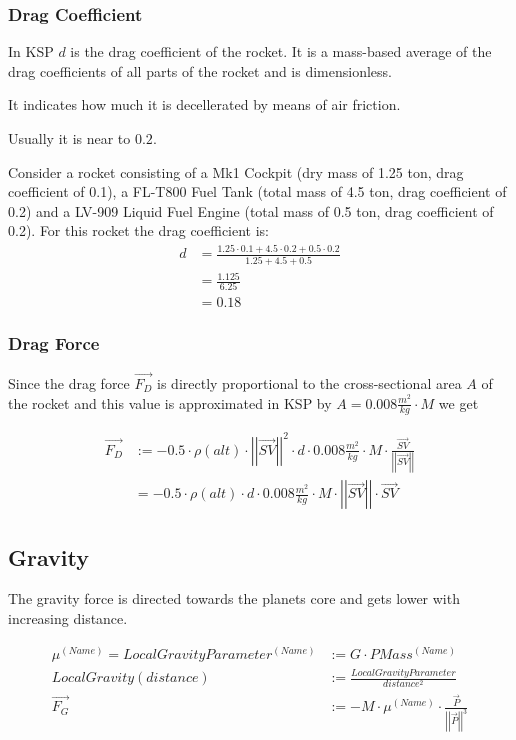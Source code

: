 \documentclass[11pt]{article}
\newcommand{\oa}[1]{\overrightarrow{#1}}
\newcommand{\F}[1]{\oa{F_{#1}}}
\newcommand{\Pos}{\oa{P}}
\newcommand{\absvec}[1]{\left|\left|{#1}\right|\right|}
\begin{document}
\subsubsection{Drag Coefficient}

In KSP $d$ is the drag coefficient of the rocket. It is a mass-based
average of the drag coefficients of all parts of the rocket and is
dimensionless.

It indicates how much it is decellerated by means of air friction.

Usually it is near to $0.2$.

Consider a rocket consisting of a Mk1 Cockpit (dry mass of 1.25 ton,
drag coefficient of 0.1), a FL-T800 Fuel Tank (total mass of 4.5 ton,
drag coefficient of 0.2) and a LV-909 Liquid Fuel Engine (total mass
of 0.5 ton, drag coefficient of 0.2). For this rocket the drag
coefficient is:
\begin{align}
  d &= \frac{1.25 \cdot 0.1 + 4.5 \cdot 0.2 + 0.5 \cdot 0.2}{ 1.25 + 4.5 + 0.5 }\nonumber\\
  &= \frac{1.125}{6.25}\nonumber\\
  &= 0.18\nonumber
\end{align}

\subsubsection{Drag Force}

Since the drag force $\F{D}$ is directly proportional to the
cross-sectional area $A$ of the rocket and this value is approximated
in KSP by $A = 0.008 \frac{m^2}{kg} \cdot M$ we get

\begin{align}
  \F{D} &:= - 0.5 \cdot \rho(alt)\cdot \absvec{\oa{SV}}^2\cdot d \cdot 0.008\frac{m^2}{kg} \cdot M \cdot \frac{\oa{SV}}{\absvec{\oa{SV}}} \nonumber\\
  &= - 0.5 \cdot \rho(alt)\cdot d \cdot 0.008\frac{m^2}{kg} \cdot M \cdot \absvec{\oa{SV}} \cdot \oa{SV}
\end{align}

\subsection{Gravity}

The gravity force is directed towards the planets core and gets lower
with increasing distance.

\begin{align}
  \mu^{(Name)} = LocalGravityParameter^{(Name)} &:= G \cdot PMass^{(Name)} \nonumber\\
  LocalGravity(distance) &:= \frac{LocalGravityParameter}{distance^2}\nonumber\\
  \F{G} &:= - M \cdot \mu^{(Name)}\cdot\frac{\Pos}{\absvec{\Pos}^3}
\end{align}
\end{document}
